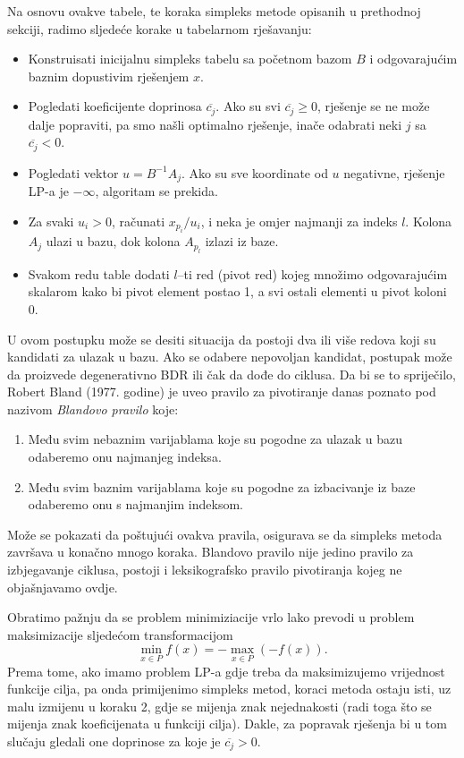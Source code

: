 \documentclass[a4paper, utf8, 11pt, colorlinks]{book}
\begin{document}
Na osnovu ovakve tabele, te koraka simpleks metode opisanih u prethodnoj sekciji, radimo sljedeće korake u tabelarnom rješavanju:
\begin{itemize}
    \item Konstruisati inicijalnu simpleks tabelu sa početnom bazom $B$ i odgovarajućim baznim dopustivim rješenjem $x$.
    \item Pogledati koeficijente doprinosa $\overline{c_j}$. Ako su svi $\overline{c_j} \geq 0$, rješenje se ne može dalje popraviti, pa smo našli optimalno rješenje, inače odabrati neki $j$ sa $\overline{c_j}<0$.
    \item Pogledati vektor $u = B^{-1}A_j$. Ako su sve koordinate od $u$ negativne, rješenje LP-a je $-\infty$, algoritam se prekida.
    \item Za svaki $u_i > 0$, računati $x_{p_i}/u_i$, i neka je   omjer najmanji za indeks $l$. Kolona $A_{j}$ ulazi u bazu, dok kolona $A_{p_l}$ izlazi iz baze. 
    \item Svakom redu table dodati $l$--ti red (pivot red) kojeg množimo odgovarajućim
         skalarom kako bi pivot element postao 1, a svi ostali elementi u pivot koloni 0.
\end{itemize}

U ovom postupku  može se desiti situacija da postoji dva ili više redova koji su kandidati za ulazak u bazu. Ako se odabere nepovoljan kandidat, postupak može da proizvede degenerativno BDR ili čak da dođe do ciklusa. 
Da bi se to spriječilo, Robert Bland (1977. godine) je uveo pravilo za pivotiranje danas poznato pod
nazivom \emph{Blandovo pravilo} koje:
\begin{enumerate}
	\item   Među svim nebaznim varijablama koje su pogodne za ulazak u bazu odaberemo onu najmanjeg indeksa. 
    \item Među svim baznim varijablama koje su pogodne za izbacivanje iz baze odaberemo onu s najmanjim indeksom.
\end{enumerate}
Može se pokazati da poštujući ovakva pravila, osigurava se da simpleks metoda  završava u konačno mnogo koraka. Blandovo pravilo nije jedino pravilo za izbjegavanje ciklusa, postoji i leksikografsko pravilo pivotiranja kojeg ne objašnjavamo ovdje.  

Obratimo pažnju da se problem minimiziacije vrlo lako prevodi u problem maksimizacije sljedećom transformacijom
$$ \min_{ x \in P} f(x) = - \max_{x \in P}(-f(x)).$$ 
Prema tome, ako imamo problem LP-a gdje treba da maksimizujemo vrijednost funkcije cilja, pa onda primijenimo simpleks metod, koraci metoda ostaju isti, uz malu izmijenu u koraku 2, gdje se mijenja znak nejednakosti (radi toga što se mijenja znak koeficijenata u funkciji cilja). Dakle, za popravak rješenja bi u tom slučaju gledali one doprinose za koje je $\overline{c_j} > 0$.
\end{document}
